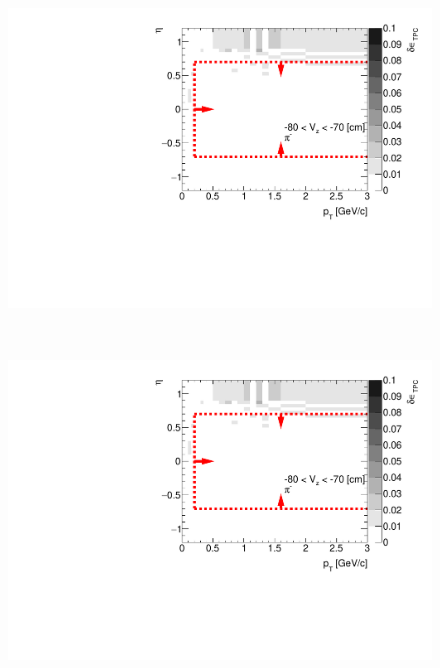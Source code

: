 \begin{figure}[H]\ContinuedFloat
	\parbox{0.325\textwidth}{
		\centering
		\includegraphics[width=\linewidth,page=13]{graphics/systematicsEfficiency/deadMaterial/secondaries_Unbinned_SDCD_.pdf}\\
	}~
	\parbox{0.325\textwidth}{
		\centering
		\includegraphics[width=\linewidth,page=14]{graphics/systematicsEfficiency/deadMaterial/secondaries_Unbinned_SDCD_.pdf}\\
	}
	\parbox{0.325\textwidth}{
		\centering
}
\end{figure}
